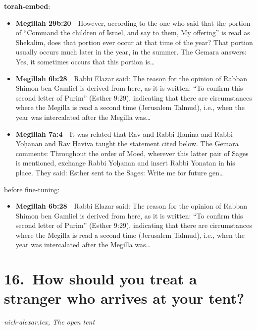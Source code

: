 \documentclass[11pt,a4paper]{article}
\begin{document}
{\color{quiet}\small\textbf{torah-embed}:}
\begin{itemize}[leftmargin=1.2em,itemsep=3pt]
\item {\color{ref}\textbf{Megillah 29b:20}}\ \ However, according to the one who said that the portion of “Command the children of Israel, and say to them, My offering” is read as Shekalim, does that portion ever occur at that time of the year? That portion usually occurs much later in the year, in the summer. The Gemara answers: Yes, it sometimes occurs that this portion is\ldots
\item {\color{ref}\textbf{Megillah 6b:28}}\ \ Rabbi Elazar said: The reason for the opinion of Rabban Shimon ben Gamliel is derived from here, as it is written: “To confirm this second letter of Purim” (Esther 9:29), indicating that there are circumstances where the Megilla is read a second time (Jerusalem Talmud), i.e., when the year was intercalated after the Megilla was\ldots
\item {\color{ref}\textbf{Megillah 7a:4}}\ \ It was related that Rav and Rabbi Ḥanina and Rabbi Yoḥanan and Rav Ḥaviva taught the statement cited below. The Gemara comments: Throughout the order of Moed, wherever this latter pair of Sages is mentioned, exchange Rabbi Yoḥanan and insert Rabbi Yonatan in his place. They said: Esther sent to the Sages: Write me for future gen\ldots
\end{itemize}
{\color{quiet}\small before fine-tuning:}
\begin{itemize}[leftmargin=1.2em]
\item {\color{ref}\textbf{Megillah 6b:28}}\ \ Rabbi Elazar said: The reason for the opinion of Rabban Shimon ben Gamliel is derived from here, as it is written: “To confirm this second letter of Purim” (Esther 9:29), indicating that there are circumstances where the Megilla is read a second time (Jerusalem Talmud), i.e., when the year was intercalated after the Megilla was\ldots
\end{itemize}

\section*{16.\ How should you treat a stranger who arrives at your tent?}
{\color{quiet}\small\textit{nick-alexar.tex, The open tent}}
\end{document}
